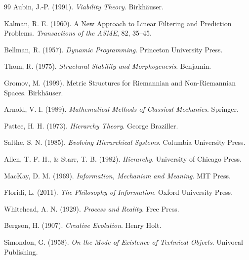 \documentclass[11pt,oneside]{book}
\theoremstyle{plain}
\theoremstyle{definition}
\theoremstyle{remark}
\begin{document}
\begin{thebibliography}{99}
Aubin, J.-P. (1991).
\newblock
\emph{Viability Theory}.
\newblock Birkhäuser.

Kalman, R. E. (1960).
\newblock A New Approach to Linear Filtering and Prediction Problems.
\newblock
\emph{Transactions of the ASME}, 82, 35--45.

Bellman, R. (1957).
\newblock
\emph{Dynamic Programming}.
\newblock Princeton University Press.

Thom, R. (1975).
\newblock
\emph{Structural Stability and Morphogenesis}.
\newblock Benjamin.

Gromov, M. (1999).
\newblock Metric Structures for Riemannian and Non-Riemannian Spaces.
\newblock Birkhäuser.

Arnold, V. I. (1989).
\newblock
\emph{Mathematical Methods of Classical Mechanics}.
\newblock Springer.

Pattee, H. H. (1973).
\newblock
\emph{Hierarchy Theory}.
\newblock George Braziller.

Salthe, S. N. (1985).
\newblock
\emph{Evolving Hierarchical Systems}.
\newblock Columbia University Press.

Allen, T. F. H.,
\& Starr, T. B. (1982).
\newblock
\emph{Hierarchy}.
\newblock University of Chicago Press.

MacKay, D. M. (1969).
\newblock
\emph{Information, Mechanism and Meaning}.
\newblock MIT Press.

Floridi, L. (2011).
\newblock
\emph{The Philosophy of Information}.
\newblock Oxford University Press.

Whitehead, A. N. (1929).
\newblock
\emph{Process and Reality}.
\newblock Free Press.

Bergson, H. (1907).
\newblock
\emph{Creative Evolution}.
\newblock Henry Holt.

Simondon, G. (1958).
\newblock
\emph{On the Mode of Existence of Technical Objects}.
\newblock Univocal Publishing.

\end{thebibliography}
\end{document}
